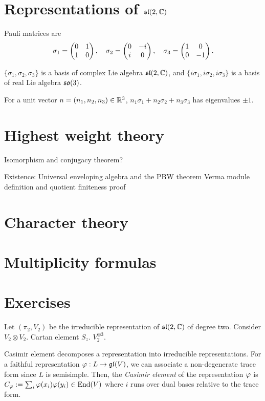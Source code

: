 \documentclass{../../large}
\begin{document}
\section{Representations of $\mathfrak{sl}(2,\mathbb{C})$}
\begin{prb}
Pauli matrices are
\[\sigma_1=\begin{pmatrix}0&1\\1&0\end{pmatrix},\quad\sigma_2=\begin{pmatrix}0&-i\\i&0\end{pmatrix},\quad\sigma_3=\begin{pmatrix}1&0\\0&-1\end{pmatrix}.\]
\begin{parts}
\item $\{\sigma_1,\sigma_2,\sigma_3\}$ is a basis of complex Lie algebra $\mathfrak{sl}(2,\mathbb{C})$, and $\{i\sigma_1,i\sigma_2,i\sigma_3\}$ is a basis of real Lie algebra $\mathfrak{so}(3)$.
\item For a unit vector $n=(n_1,n_2,n_3)\in\mathbb{R}^3$, $n_1\sigma_1+n_2\sigma_2+n_3\sigma_3$ has eigenvalues $\pm1$.
\end{parts}
\end{prb}
\section{Highest weight theory}

Isomorphism and conjugacy theorem?

Existence:
Universal enveloping algebra and the PBW theorem
Verma module definition and quotient finiteness proof

\section{Character theory}

\section{Multiplicity formulas}

\section*{Exercises}
\begin{prb}
Let $(\pi_2,V_2)$ be the irreducible representation of $\mathfrak{sl}(2,\mathbb{C})$ of degree two.
Consider $V_2\otimes V_2$.
Cartan element $S_z$.
$V_2^{\otimes3}$.
\end{prb}
\begin{prb}
Casimir element decomposes a representation into irreducible representations.
For a faithful representation $\varphi:L\to\mathfrak{gl}(V)$, we can associate a non-degenerate trace form since $L$ is semisimple.
Then, the \emph{Casimir element} of the representation $\varphi$ is $C_\varphi:=\sum_i\varphi(x_i)\varphi(y_i)\in\operatorname{End}(V)$ where $i$ runs over dual bases relative to the trace form.
\end{prb}
\end{document}
